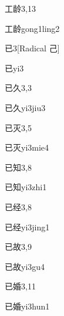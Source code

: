 \begin{entry}{工龄}{3,13}
  \begin{phonetics}{工龄}{gong1ling2}
  \end{phonetics}
\end{entry}

\begin{entry}{已}{3}[Radical 己]
  \begin{phonetics}{已}{yi3}
  \end{phonetics}
\end{entry}

\begin{entry}{已久}{3,3}
  \begin{phonetics}{已久}{yi3jiu3}
  \end{phonetics}
\end{entry}

\begin{entry}{已灭}{3,5}
  \begin{phonetics}{已灭}{yi3mie4}
  \end{phonetics}
\end{entry}

\begin{entry}{已知}{3,8}
  \begin{phonetics}{已知}{yi3zhi1}
  \end{phonetics}
\end{entry}

\begin{entry}{已经}{3,8}
  \begin{phonetics}{已经}{yi3jing1}
  \end{phonetics}
\end{entry}

\begin{entry}{已故}{3,9}
  \begin{phonetics}{已故}{yi3gu4}
  \end{phonetics}
\end{entry}

\begin{entry}{已婚}{3,11}
  \begin{phonetics}{已婚}{yi3hun1}
  \end{phonetics}
\end{entry}

